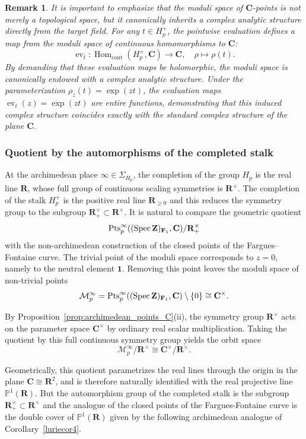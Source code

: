 \documentclass[11pt,a4paper]{article}
\newtheorem{remark}[theorem]{Remark}
\newcommand{\C}{\mathbf{C}}
\newcommand{\R}{\mathbf{R}}
\newcommand{\Z}{\mathbf{Z}}
\def\spzf{(\Spec \Z)_{\mathbf{F}_{1}}}
\newcommand{\Pt}{{\rm Pts}}
\newcommand{\Spec}{\operatorname{Spec}}
\begin{document}
\begin{remark}\label{complexan}
It is important to emphasize that the moduli space of $\C$-points  is not merely a topological space, but it canonically inherits a complex analytic structure directly from the target field. For any $t \in H_p^+$, the pointwise evaluation defines a map from the moduli space of continuous homomorphisms to $\C$:
\[
\operatorname{ev}_t : \operatorname{Hom}_{\text{cont}}(H_p^+, \C) \longrightarrow \C, \quad \rho \longmapsto \rho(t).
\]
By demanding that these evaluation maps be holomorphic, the moduli space is canonically endowed with a complex analytic structure. Under the parameterization $\rho_z(t) = \exp(zt)$, the evaluation maps $\operatorname{ev}_t(z) = \exp(zt)$ are entire functions, demonstrating that this induced complex structure coincides exactly with the standard complex structure of the plane $\C$. 
\end{remark}


\subsubsection{Quotient by the automorphisms of the completed stalk}

At the archimedean place $\infty\in\Sigma_{H_p}$, the completion of the group $H_p$ is the real line $\R$, whose full group of continuous scaling symmetries is $\R^\times$. The completion of the stalk $H_p^+$ is the positive real line $\R_{\geq 0}$ and this reduces the symmetry group to the subgroup $\R_+^\times \subset \R^\times$.
It is natural to compare the geometric quotient
\[
\Pt_p^\infty(\spzf,\C)/\R_+^\times
\]
with the non-archimedean construction of the closed points of the Fargues–Fontaine curve. The trivial point of the moduli space corresponds to $z=0$, namely to the neutral element $\mathbf 1$. Removing this point leaves the moduli space of non-trivial points
\[
\mathcal M_p^\infty
=
\Pt_p^\infty(\spzf,\C)\setminus\{0\}
\cong
\C^\times.
\]

By Proposition~\ref{prop:archimedean_points_C}(ii), the symmetry group $\R^\times$ acts on the parameter space $\C^\times$ by ordinary real scalar multiplication. Taking the quotient by this full continuous symmetry group yields the orbit space
\[
\mathcal M_p^\infty/\R^\times
\cong
\C^\times/\R^\times.
\]

Geometrically, this quotient parametrizes the real lines through the origin in the plane $\C\cong\R^2$, and is therefore naturally identified with the real projective line
$\mathbb P^1(\R)$. But the automorphism group of the completed stalk is the subgroup $\R_+^\times\subset \R^\times$ and the analogue of the closed points of the Fargues-Fontaine curve is the double cover of $\mathbb P^1(\R)$ 
given by the following archimedean analogue of Corollary~\ref{luriecor4}.
\end{document}
